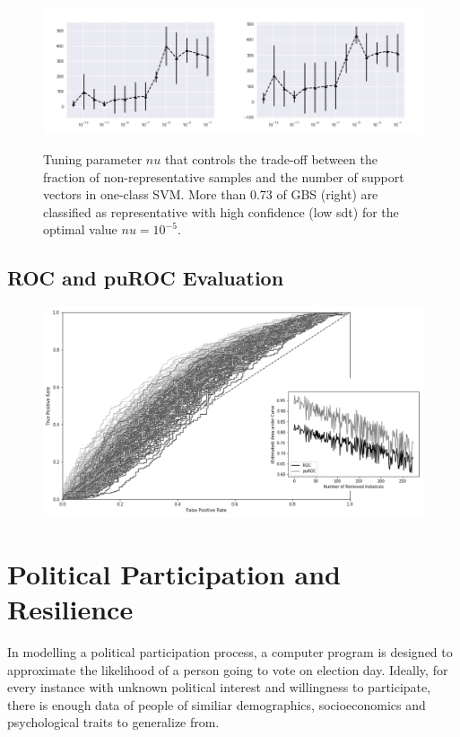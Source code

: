 \begin{figure}[ht]
	\begin{center}
		\includegraphics[scale=0.55,angle=0]{fig/occfigure}
		\label{occ}
		\vspace*{-1.0cm}
		\caption{Tuning parameter \(nu\) that controls the trade-off between the fraction of non-representative samples and the number of support vectors in one-class SVM. More than 0.73 of GBS (right) are classified as representative with high confidence (low sdt) for the optimal value \(nu = 10^{-5}\).}
	\end{center}
\end{figure}

\subsection{ROC and puROC Evaluation}

\begin{figure}
\centering
		\includegraphics[scale=0.50,angle=0]{fig/res1}
   \label{fig:Ng1} 
\end{figure}

\section{Political Participation and Resilience}

In modelling a political participation process, a computer program is designed to approximate the likelihood of a person going to vote on election day. Ideally, for every instance with unknown political interest and willingness to participate, there is enough data of people of similiar demographics, socioeconomics and psychological traits to generalize from. 

